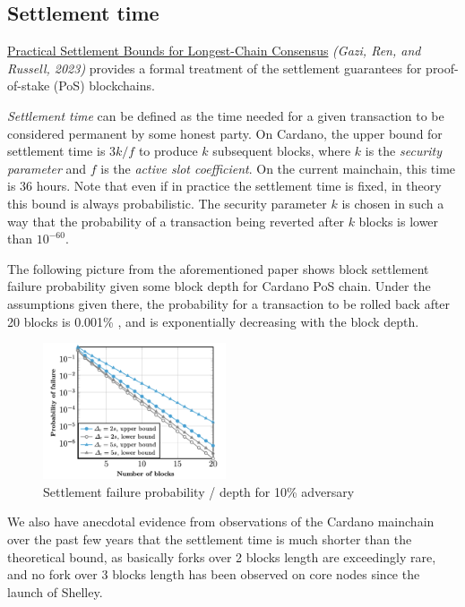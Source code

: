 \documentclass[10pt]{article}
\begin{document}
\subsection{Settlement time}\label{settlement-time}

\href{https://eprint.iacr.org/2022/1571.pdf}{Practical Settlement Bounds
for Longest-Chain Consensus} \emph{(Gazi, Ren, and Russell, 2023)}
provides a formal treatment of the settlement guarantees for
proof-of-stake (PoS) blockchains.

\emph{Settlement time} can be defined as the time needed for a given
transaction to be considered permanent by some honest party. On Cardano,
the upper bound for settlement time is \(3k / f\) to produce \(k\)
subsequent blocks, where \(k\) is the \emph{security parameter} and
\(f\) is the \emph{active slot coefficient}. On the current mainchain,
this time is 36 hours. Note that even if in practice the settlement time
is fixed, in theory this bound is always probabilistic. The security
parameter \(k\) is chosen in such a way that the probability of a
transaction being reverted after \(k\) blocks is lower than
\(10^{-60}\).

The following picture from the aforementioned paper shows block
settlement failure probability given some block depth for Cardano PoS
chain. Under the assumptions given there, the probability for a
transaction to be rolled back after 20 blocks is 0.001\% , and is
exponentially decreasing with the block depth.

\begin{figure}
\centering
\includegraphics[width=0.48\textwidth]{../diagrams/settlement-failure-probability.png}
\caption{Settlement failure probability / depth for 10\% adversary}
\end{figure}

We also have anecdotal evidence from observations of the Cardano
mainchain over the past few years that the settlement time is much
shorter than the theoretical bound, as basically forks over 2 blocks
length are exceedingly rare, and no fork over 3 blocks length has been
observed on core nodes since the launch of Shelley.
\end{document}
